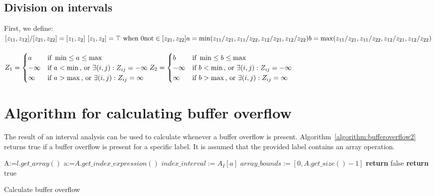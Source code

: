 \subsection{Division on intervals}
First, we define:\\
$
[z_{11}, z_{12}] / [z_{21}, z_{22}] = [z_{1}, z_{2}]\
[z_{1}, z_{2}] = \top \text{ when } 0 \text{not} \in [z_{21}, z_{22}]\\
a = \min(z_{11} / z_{21}, z_{11} / z_{22}, z_{12} / z_{21}, z_{12} / z_{22})\\
b = \max(z_{11} / z_{21}, z_{11} / z_{22}, z_{12} / z_{21}, z_{12} / z_{22})\\
$\\\\
$Z_1 =
     \begin{cases} 
        a       & \text{if } \min \leq a \leq \max \\
        -\infty & \text{if } a < \min \text{, or } \exists (i,j) : {Z_{ij} = -\infty} \\
        \infty & \text{if } a > \max \text{, or } \exists (i,j) : {Z_{ij} = \infty} \\
     \end{cases}\\
Z_2 =
     \begin{cases} 
        b       & \text{if } \min \leq b \leq \max \\
        -\infty & \text{if } b < \min \text{, or } \exists (i,j) : {Z_{ij} = -\infty} \\
        \infty & \text{if } b > \max \text{, or } \exists (i,j) : {Z_{ij} = \infty} \\
     \end{cases}
$

\section{Algorithm for calculating buffer overflow}
The result of an interval analysis can be used to calculate whenever a buffer overflow is present. Algorithm~\ref{algorithm:bufferoverflow2} returns true if a buffer overflow is present for a specific label. It is assumed that the provided label contains an array operation.
\begin{algorithm}
 \begin{algorithmic}[1]
\State A:=$l.get\_array()$
\State a:=$A.get\_index\_expression()$
\State $index\_interval:=A_I[a]$
\State $array\_bounds:=[0,A.get\_size()-1]$
\State \textbf{return} false
\Else
\State \textbf{return} true
\EndIf 
 \EndProcedure
 \end{algorithmic}
 \caption{Calculate buffer overflow}
 \label{algorithm:bufferoverflow2}
\end{algorithm}

